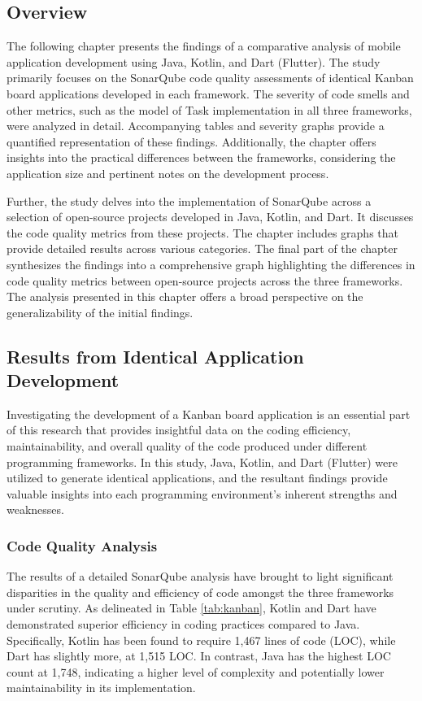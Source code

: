 \subsection{Overview}
The following chapter presents the findings of a comparative analysis of mobile application development using Java, Kotlin, and Dart (Flutter). The study primarily focuses on the SonarQube code quality assessments of identical Kanban board applications developed in each framework. The severity of code smells and other metrics, such as the model of Task implementation in all three frameworks, were analyzed in detail. Accompanying tables and severity graphs provide a quantified representation of these findings. Additionally, the chapter offers insights into the practical differences between the frameworks, considering the application size and pertinent notes on the development process.
\par
Further, the study delves into the implementation of SonarQube across a selection of open-source projects developed in Java, Kotlin, and Dart. It discusses the code quality metrics from these projects. The chapter includes graphs that provide detailed results across various categories. The final part of the chapter synthesizes the findings into a comprehensive graph highlighting the differences in code quality metrics between open-source projects across the three frameworks. The analysis presented in this chapter offers a broad perspective on the generalizability of the initial findings.

\subsection{Results from Identical Application Development}
Investigating the development of a Kanban board application is an essential part of this research that provides insightful data on the coding efficiency, maintainability, and overall quality of the code produced under different programming frameworks. In this study, Java, Kotlin, and Dart (Flutter) were utilized to generate identical applications, and the resultant findings provide valuable insights into each programming environment's inherent strengths and weaknesses. 
\subsubsection{Code Quality Analysis}
The results of a detailed SonarQube analysis have brought to light significant disparities in the quality and efficiency of code amongst the three frameworks under scrutiny. As delineated in Table \ref*{tab:kanban}, Kotlin and Dart have demonstrated superior efficiency in coding practices compared to Java. Specifically, Kotlin has been found to require 1,467 lines of code (LOC), while Dart has slightly more, at 1,515 LOC. In contrast, Java has the highest LOC count at 1,748, indicating a higher level of complexity and potentially lower maintainability in its implementation.


